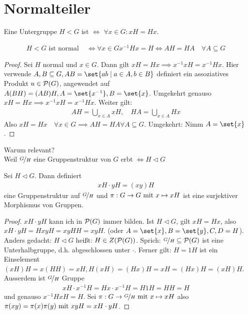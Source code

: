 \section{Normalteiler}
\begin{definition}
	Eine Untergruppe $H < G$ ist  $\Leftrightarrow$ $\forall x \in G\colon xH = Hx$.
\end{definition}
\begin{proposition}
	\begin{align*}
		H < G \text{ ist normal } &\Leftrightarrow \forall x \in G x^{-1}Hx = H \Leftrightarrow AH = HA \quad \forall A \subseteq G
	\end{align*}
\end{proposition}
\begin{proof}
	Sei $H$ normal und $x \in G$. Dann gilt $xH = Hx \implies x^{-1}xH = x^{-1}Hx$. Hier verwende $A,B \subseteq G, AB = \set{ab \mid a \in A, b \in B}$ definiert ein assoziatives Produkt $u \in \powerset(G)$, angewendet auf $A(BH) = (AB)H, A = \set{x^{-1}}, B=\set{x}$. Umgekehrt genauso $xH = Hx \implies x^{-1}xH = x^{-1}Hx$. Weiter gilt:
	\begin{align*}
		AH = \bigcup_{x \in A} x H, \quad HA = \bigcup_{x \in A} Hx
	\end{align*}
	Also $xH = Hx\quad \forall x \in G \implies AH=HA \forall A \subseteq G$. Umgekehrt: Nimm $A = \set{x}$.
\end{proof}
Warum relevant?\\
Weil $\lnkset{G}{H}$ eine Gruppenstruktur von $G$ erbt $\Leftrightarrow H \lhd G$
\begin{proposition}
	\label{1_4_3_prop}
	Sei $H \lhd G$. Dann definiert
	\begin{align*}
		xH \cdot yH = (xy)H
	\end{align*}
	eine Gruppenstruktur auf $\lnkset{G}{H}$ und $\pi: G \to G \mit x \mapsto xH$ ist eine surjektiver Morphismus von Gruppen.
\end{proposition}
\begin{proof}
	$xH \cdot yH$ kann ich in $\powerset(G)$ immer bilden. Ist $H \lhd G$, gilt $xH = Hx$, also $xH\cdot yH = HxyH = xyHH = xyH$. (oder $A=\set{x}, B = \set{y}, C,D=H$). Anders gedacht: $H \lhd G$ heißt: $H \in Z(\powerset(G))$. Sprich: $\lnkset{G}{H} \subseteq \powerset(G)$ ist eine Unterhalbgruppe, d.h. abgeschlossen unter $\cdot$. Ferner gilt: $H = 1H$ ist ein Einselement $(xH)H = x(HH) = xH, H(xH) = (Hx)H = xH=(Hx)H=(xH)H$. Ausserdem ist $\lnkset{G}{H}$ Gruppe 
	\begin{align*}
		xH \cdot x^{-1}H = Hx\cdot x^{-1}H = H1H = HH = H
	\end{align*}
	und genauso $x^{-1}HxH = H$. Sei $\pi: G \to \lnkset{G}{H} \mit x \mapsto xH$ also $\pi(xy) = \pi(x)\pi(y) \mit xyH = xH \cdot yH$.
\end{proof}
